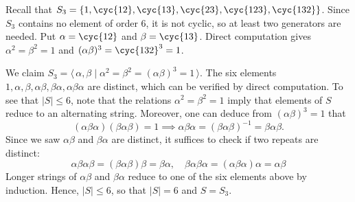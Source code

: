 \begin{sol}
    Recall that $S_3 = \{1, \cyc{1 2}, \cyc{1 3}, \cyc{2 3}, \cyc{1 2 3}, \cyc{1 3 2}\}$. 
    Since $S_3$ contains no element of order 6, it is not cyclic, so at least two generators are needed. 
    Put $\alpha = \cyc{1 2}$ and $\beta = \cyc{1 3}$. Direct computation gives $\alpha^2 = \beta^2 = 1$ and $(\alpha\beta)^3 = \cyc{1 3 2}^3 = 1$.

    We claim $S_3= \langle\, \alpha, \beta \mid \alpha^2 = \beta^2 = (\alpha\beta)^3 = 1\,\rangle$. 
    The six elements $1, \alpha, \beta, \alpha\beta, \beta\alpha, \alpha\beta\alpha$ are distinct, which can be verified by direct computation. 
    To see that $|S| \leq 6$, note that the relations $\alpha^2 = \beta^2 = 1$ imply that elements of $S$ reduce to an alternating string. 
    Moreover, one can deduce from $(\alpha\beta)^3 = 1$ that
    \[
        (\alpha\beta\alpha)(\beta\alpha\beta) = 1 \implies \alpha\beta\alpha = (\beta\alpha\beta)^{-1} = \beta\alpha\beta.
    \]
    Since we saw $\alpha\beta$ and $\beta\alpha$ are distinct, it suffices to check if two repeats are distinct:
    \[
        \alpha\beta\alpha\beta = (\beta\alpha\beta)\beta = \beta\alpha, \quad \beta\alpha\beta\alpha = (\alpha\beta\alpha)\alpha = \alpha\beta
    \]
    Longer strings of $\alpha\beta$ and $\beta\alpha$ reduce to one of the six elements above by induction. 
    Hence, $|S| \leq 6$, so that $|S| = 6$ and $S = S_3$.
\end{sol}